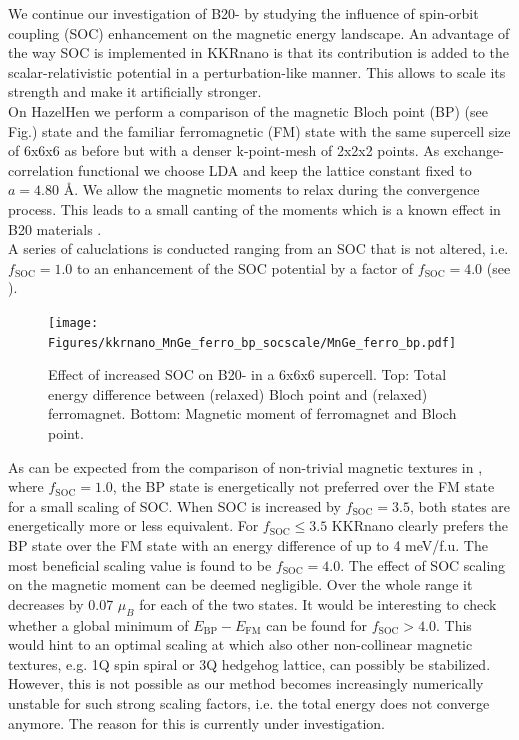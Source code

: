 \documentclass [a4paper, 12pt]{article}
\begin{document}
We continue our investigation of B20- by studying the influence of spin-orbit
coupling (SOC) enhancement on the magnetic energy landscape.
An advantage of the way SOC is implemented in KKRnano is that
its contribution is added to the scalar-relativistic
potential in a perturbation-like manner. This allows to scale its strength and make it
artificially stronger.
\\
On HazelHen we perform a comparison of the magnetic Bloch point (BP) (see Fig.) 
state and the familiar ferromagnetic (FM) state
with the same supercell size of 6x6x6 as before but with a denser k-point-mesh of 2x2x2 points.
As exchange-correlation functional we choose LDA and keep the lattice constant fixed to $a=4.80$ \AA.
We allow the magnetic moments to relax during the convergence process.
This leads to a small canting of the moments which is a known effect in
B20 materials \cite{chizhikov_multishell_2013}.
\\
A series of caluclations is conducted ranging from an SOC that is not altered, i.e. $f_{\text{SOC}}=1.0$ to
an enhancement of the SOC potential by a
factor of $f_{\text{SOC}}=4.0$ (see ).
\begin{figure}[h]
\begin{center}
 \texttt{[image: Figures/kkrnano\_MnGe\_ferro\_bp\_socscale/MnGe\_ferro\_bp.pdf]}
\end{center}
\caption{Effect of increased SOC on B20- in a 6x6x6 supercell.
	Top: Total energy difference between (relaxed) Bloch point and (relaxed) ferromagnet.
	Bottom: Magnetic moment of ferromagnet and Bloch point.
	}
\label{fig:MnGe_ferro_bp_socscale}
\end{figure}
As can be expected from the comparison of non-trivial magnetic textures 
in , where $f_{\text{SOC}}=1.0$, 
the BP state is energetically not preferred over the FM state for a small
scaling of SOC.
When SOC is increased by $f_{\text{SOC}}=3.5$,
both states are energetically more or less equivalent.
For $f_{\text{SOC}} \leq 3.5$ KKRnano clearly prefers the BP state over the FM state with
an energy difference of up to 4 meV/f.u.
The most beneficial scaling value is found to be $f_{\text{SOC}}=4.0$.
The effect of SOC scaling on the magnetic moment can be deemed negligible. Over the whole
range it decreases by 0.07 $\mu_{B}$ for each of the two states.
It would be interesting to check whether a global minimum of $E_{\text{BP}}-E_{\text{FM}}$ can
be found for $f_{\text{SOC}} > 4.0$. This would hint to an optimal
scaling at which also other non-collinear magnetic textures, e.g. 1Q spin spiral or
3Q hedgehog lattice, can possibly be stabilized.
However, this is not possible as our method becomes increasingly numerically unstable for 
such strong scaling factors, i.e. the total energy does not converge anymore.
The reason for this is currently under investigation.
\end{document}
